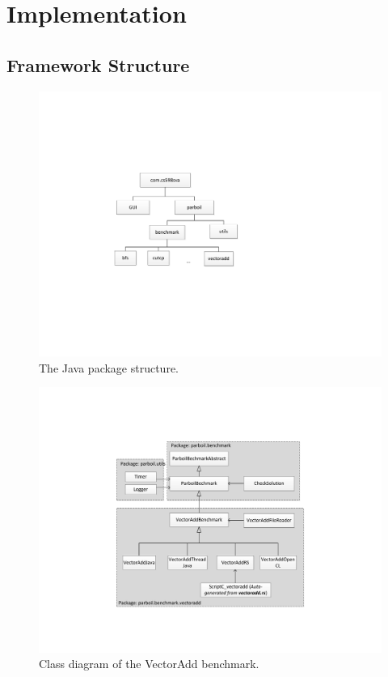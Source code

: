 \section{Implementation}
\label{sec:implementation}

\subsection{Framework Structure}

\begin{figure}
\centering
\includegraphics[scale=0.65]{figs/package_diagram.pdf}
\caption{The Java package structure.}
\label{fig:package_structure}
\centering
\end{figure}


\begin{figure}
\centering
\includegraphics[scale=0.5]{figs/vectoradd_class_diagram.pdf}
\caption{Class diagram of the VectorAdd benchmark.}
\label{fig:class_diagram}
\centering
\end{figure}


